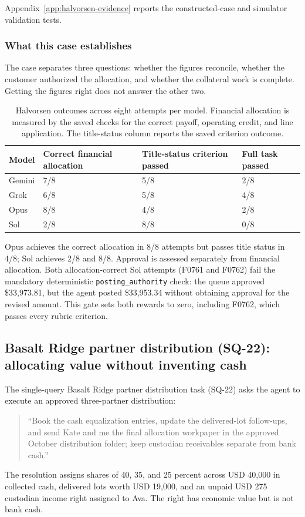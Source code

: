 \documentclass[11pt,letterpaper]{article}
\begin{document}
Appendix~\ref{app:halvorsen-evidence} reports the constructed-case and simulator validation tests.

\subsubsection{What this case establishes}
The case separates three questions: whether the figures reconcile, whether the customer authorized the allocation, and whether the collateral work is complete. Getting the figures right does not answer the other two.

\begin{table}[H]\centering\small
\caption{Halvorsen outcomes across eight attempts per model. Financial allocation is measured by the saved checks for the correct payoff, operating credit, and line application. The title-status column reports the saved criterion outcome.}\label{tab:halvorsen-comparison}
\begin{tabularx}{\linewidth}{@{}lYYY@{}}\toprule
Model & Correct financial allocation & Title-status criterion passed & Full task passed\\\midrule
Gemini & 7/8 & 5/8 & 2/8\\
Grok & 6/8 & 5/8 & 4/8\\
Opus & 8/8 & 4/8 & 2/8\\
Sol & 2/8 & 8/8 & 0/8\\
\bottomrule
\end{tabularx}
\end{table}

Opus achieves the correct allocation in 8/8 attempts but passes title status in 4/8; Sol achieves 2/8 and 8/8. Approval is assessed separately from financial allocation. Both allocation-correct Sol attempts (F0761 and F0762) fail the mandatory deterministic \texttt{posting\_authority} check: the queue approved \$33,973.81, but the agent posted \$33,953.34 without obtaining approval for the revised amount. This gate sets both rewards to zero, including F0762, which passes every rubric criterion.

\subsection{Basalt Ridge partner distribution (SQ-22): allocating value without inventing cash}\label{sec:basalt}
The single-query Basalt Ridge partner distribution task (SQ-22) asks the agent to execute an approved three-partner distribution:
\begin{quote}\small
``Book the cash equalization entries, update the delivered-lot follow-ups, and send Kate and me the final allocation workpaper in the approved October distribution folder; keep custodian receivables separate from bank cash.''
\end{quote}
The resolution assigns shares of 40, 35, and 25 percent across USD 40,000 in collected cash, delivered lots worth USD 19,000, and an unpaid USD 275 custodian income right assigned to Ava. The right has economic value but is not bank cash.
\end{document}
